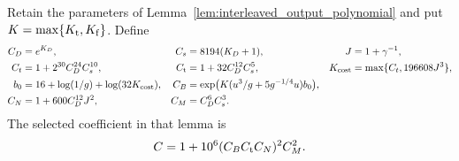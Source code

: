 \begin{definition}
    \label{def:interleaved_output_coefficient}
    \leanok
    Retain the parameters of Lemma~\ref{lem:interleaved_output_polynomial}
    and put $K=\max\{K_{\rm t},K_{\rm f}\}$. Define
    \begin{align}
        C_D          & =e^{K_D},                                      & C_s & =8194(K_D+1),      & J & =1+\gamma^{-1},\notag \\
        C_t          & =1+2^{30}C_D^{24}C_s^{10},                     &
        C_{\rm t}    & =1+32C_D^{12}C_s^5,                            &
        K_{\rm cost} & =\max\{C_t,196608J^3\},\notag                                                                         \\
        b_0          & =16+\log(1/g)+\log(32K_{\rm cost}),            &
        C_B          & =\exp\bigl(K(u^3/g+5g^{-1/4}u)b_0\bigr),\notag                                                        \\
        C_N          & =1+600C_D^{12}J^2,                             & C_M & =C_D^6C_s^3.\notag
    \end{align}
    The selected coefficient in that lemma is
    \begin{align}
        C=1+10^6(C_BC_{\rm t}C_N)^2C_M^2.
        \label{eq:interleaved_output_selected_coefficient}
    \end{align}
\end{definition}

